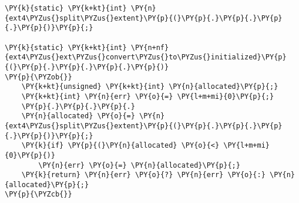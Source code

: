 \begin{Verbatim}[commandchars=\\\{\}]
\PY{k}{static} \PY{k+kt}{int} \PY{n}{ext4\PYZus{}split\PYZus{}extent}\PY{p}{(}\PY{p}{.}\PY{p}{.}\PY{p}{.}\PY{p}{)}\PY{p}{;}

\PY{k}{static} \PY{k+kt}{int} \PY{n+nf}{ext4\PYZus{}ext\PYZus{}convert\PYZus{}to\PYZus{}initialized}\PY{p}{(}\PY{p}{.}\PY{p}{.}\PY{p}{.}\PY{p}{)}
\PY{p}{\PYZob{}}
	\PY{k+kt}{unsigned} \PY{k+kt}{int} \PY{n}{allocated}\PY{p}{;}
	\PY{k+kt}{int} \PY{n}{err} \PY{o}{=} \PY{l+m+mi}{0}\PY{p}{;}
	\PY{p}{.}\PY{p}{.}\PY{p}{.}
	\PY{n}{allocated} \PY{o}{=} \PY{n}{ext4\PYZus{}split\PYZus{}extent}\PY{p}{(}\PY{p}{.}\PY{p}{.}\PY{p}{.}\PY{p}{)}\PY{p}{;}
	\PY{k}{if} \PY{p}{(}\PY{n}{allocated} \PY{o}{<} \PY{l+m+mi}{0}\PY{p}{)}
		\PY{n}{err} \PY{o}{=} \PY{n}{allocated}\PY{p}{;}
	\PY{k}{return} \PY{n}{err} \PY{o}{?} \PY{n}{err} \PY{o}{:} \PY{n}{allocated}\PY{p}{;}
\PY{p}{\PYZcb{}}
\end{Verbatim}
